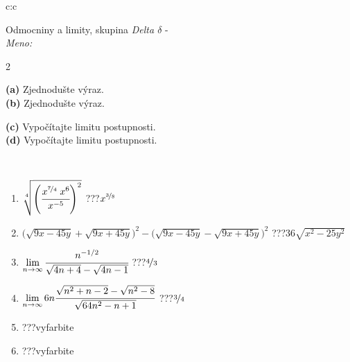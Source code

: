 \documentclass[10pt]{report}
\begin{document}
\begin{tabular}{c:c}
\begin{minipage}[c][104.5mm][t]{0.5\linewidth}
\begin{center}
\vspace{7mm}
{\huge Odmocniny a limity, skupina \textit{Delta $\delta$} -}\\[5mm]
\textit{Meno:}\phantom{xxxxxxxxxxxxxxxxxxxxxxxxxxxxxxxxxxxxxxxxxxxxxxxxxxxxxxxxxxxxxxxxx}\\[5mm]
\begin{minipage}{0.95\linewidth}
\begin{center}
{\small \begin{multicols}{2} \raggedright
\textbf{(a)} Zjednodušte výraz. \\[1mm]
\textbf{(b)} Zjednodušte výraz. \par \columnbreak
\textbf{(c)} Vypočítajte limitu postupnosti. \\[1mm]
\textbf{(d)} Vypočítajte limitu postupnosti.
\end{multicols}
}
\end{center}
\end{minipage}
\\[4mm]
\begin{minipage}{0.79\linewidth}
\begin{center}
\begin{varwidth}{\linewidth}
\begin{enumerate}
\small
\item $\sqrt[4]{\left(\cfrac{x^{\nicefrac{7}{4}}\;x^{6}}{x^{-5}}\right)^{2}}$\quad \dotfill\; ???\;\dotfill \quad $x^{\nicefrac{3}{8}}$
\item {\footnotesize{\scriptsize$\big(\sqrt{9x-45y}+\sqrt{9x+45y}\big)^2-\big(\sqrt{9x-45y}-\sqrt{9x+45y}\big)^2$}\quad \dotfill\; ???\;\dotfill \quad $36\sqrt{x^2-25y^2}$}
\item $\lim\limits_{n\to\infty}\cfrac{n^{-1/2}}{\sqrt{4n+4}-\sqrt{4n-1}}$\quad \dotfill\; ???\;\dotfill \quad $\nicefrac{4}{3}$
\item $\lim\limits_{n\to\infty}6n\cfrac{\sqrt{n^2+n-2}-\sqrt{n^2-8}}{\sqrt{64n^2-n+1}}$\quad \dotfill\; ???\;\dotfill \quad $\nicefrac{3}{4}$
\item \quad \dotfill\; ???\;\dotfill \quad vyfarbite
\item \quad \dotfill\; ???\;\dotfill \quad vyfarbite
\end{enumerate}
\end{varwidth}
\end{center}
\end{minipage}

\end{center}
\end{minipage}
\end{tabular}
\end{document}
